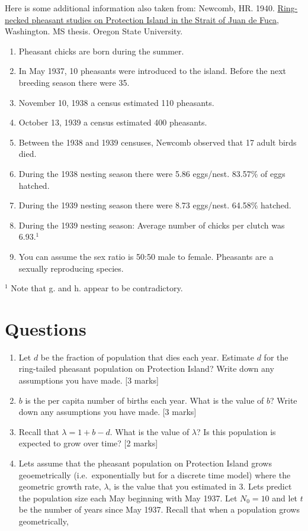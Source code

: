 \documentclass[]{book}
\providecommand{\tightlist}{%
  \setlength{\itemsep}{0pt}\setlength{\parskip}{0pt}}
\begin{document}
Here is some additional information also taken from: Newcomb, HR. 1940.
\href{https://ir.library.oregonstate.edu/concern/graduate_thesis_or_dissertations/js956j801?locale=en}{Ring-necked
pheasant studies on Protection Island in the Strait of Juan de Fuca},
Washington. MS thesis. Oregon State University.

\begin{enumerate}
\def\labelenumi{\alph{enumi}.}
\tightlist
\item
  Pheasant chicks are born during the summer.
\item
  In May 1937, 10 pheasants were introduced to the island. Before the
  next breeding season there were 35.
\item
  November 10, 1938 a census estimated 110 pheasants.
\item
  October 13, 1939 a census estimated 400 pheasants.
\item
  Between the 1938 and 1939 censuses, Newcomb observed that 17 adult
  birds died.
\item
  During the 1938 nesting season there were 5.86 eggs/nest. 83.57\% of
  eggs hatched.
\item
  During the 1939 nesting season there were 8.73 eggs/nest. 64.58\%
  hatched.
\item
  During the 1939 nesting season: Average number of chicks per clutch
  was 6.93.\(^1\)
\item
  You can assume the sex ratio is 50:50 male to female. Pheasants are a
  sexually reproducing species.
\end{enumerate}

\(^1\) Note that g. and h. appear to be contradictory.

\section{Questions}\label{questions}

\begin{enumerate}
\def\labelenumi{\arabic{enumi}.}
\item
  Let \(d\) be the fraction of population that dies each year. Estimate
  \(d\) for the ring-tailed pheasant population on Protection Island?
  Write down any assumptions you have made. {[}3 marks{]}
\item
  \(b\) is the per capita number of births each year. What is the value
  of \(b\)? Write down any assumptions you have made. {[}3 marks{]}
\item
  Recall that \(\lambda = 1 + b-d\). What is the value of \(\lambda\)?
  Is this population is expected to grow over time? {[}2 marks{]}
\item
  Lets assume that the pheasant population on Protection Island grows
  geoemetrically (i.e.~exponentially but for a discrete time model)
  where the geometric growth rate, \(\lambda\), is the value that you
  estimated in 3. Lets predict the population size each May beginning
  with May 1937. Let \(N_0 = 10\) and let \(t\) be the number of years
  since May 1937. Recall that when a population grows geometrically,
\end{enumerate}
\end{document}
